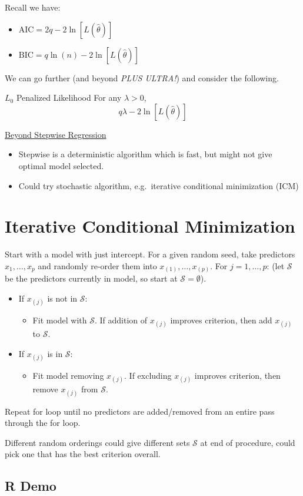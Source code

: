 Recall we have:
\begin{itemize}
      \item $ \text{AIC}=2q-2\ln[L(\hat{\theta})] $
      \item $ \text{BIC}=q\ln(n)-2\ln[L(\hat{\theta})] $
\end{itemize}
We can go further (and beyond \emph{PLUS ULTRA!}) and consider the following.
\begin{Definition}{$ L_0 $ Penalized Likelihood}{}
      For any $ \lambda>0 $,
      \[ q\lambda -2\ln[L(\hat{\theta})] \]
\end{Definition}
\underline{Beyond Stepwise Regression}
\begin{itemize}
      \item Stepwise is a deterministic algorithm which is fast,
            but might not give optimal model selected.
      \item Could try stochastic algorithm, e.g.\ iterative
            conditional minimization (ICM)
\end{itemize}

\section{Iterative Conditional Minimization}
Start with a model with just intercept.
For a given random seed, take predictors $ x_1,\ldots,x_p $
and randomly re-order them into $ x_{(1)},\ldots,x_{(p)} $.
For $ j=1,\ldots,p $: (let $ \mathcal{S} $ be the predictors
currently in model, so start at $ \mathcal{S}=\emptyset $).
\begin{itemize}
      \item If $ x_{(j)} $ is not in $ \mathcal{S} $:
            \begin{itemize}
                  \item Fit model with $ \mathcal{S} $.
                        If addition of $ x_{(j)} $ improves criterion,
                        then add $ x_{(j)} $ to $ \mathcal{S} $.
            \end{itemize}
      \item If $ x_{(j)} $ is in $ \mathcal{S} $:
            \begin{itemize}
                  \item Fit model removing $ x_{(j)} $. If excluding
                        $ x_{(j)} $ improves criterion, then remove
                        $ x_{(j)} $ from $ \mathcal{S} $.
            \end{itemize}
\end{itemize}
Repeat for loop until no predictors are added/removed
from an entire pass through the for loop.
\begin{Remark}{}{}
      Different random orderings could give different
      sets $ \mathcal{S} $ at end of procedure, could pick one
      that has the best criterion overall.
\end{Remark}
\subsection{R Demo}

